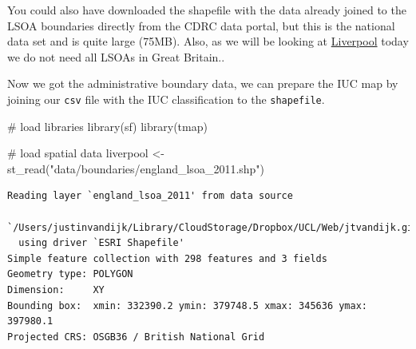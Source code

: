\documentclass[
  letterpaper,
  DIV=11,
  numbers=noendperiod]{scrreprt}
\newenvironment{Shaded}{\begin{snugshade}}{\end{snugshade}}
\newcommand{\CommentTok}[1]{\textcolor[rgb]{0.37,0.37,0.37}{#1}}
\newcommand{\FunctionTok}[1]{\textcolor[rgb]{0.28,0.35,0.67}{#1}}
\newcommand{\NormalTok}[1]{\textcolor[rgb]{0.00,0.23,0.31}{#1}}
\newcommand{\OtherTok}[1]{\textcolor[rgb]{0.00,0.23,0.31}{#1}}
\newcommand{\StringTok}[1]{\textcolor[rgb]{0.13,0.47,0.30}{#1}}
\begin{document}
\begin{tcolorbox}[enhanced jigsaw, rightrule=.15mm, colback=white, opacityback=0, opacitybacktitle=0.6, coltitle=black, colbacktitle=quarto-callout-note-color!10!white, breakable, arc=.35mm, title=\textcolor{quarto-callout-note-color}{\faInfo}\hspace{0.5em}{Note}, left=2mm, leftrule=.75mm, bottomtitle=1mm, toprule=.15mm, bottomrule=.15mm, colframe=quarto-callout-note-color-frame, toptitle=1mm, titlerule=0mm]

You could also have downloaded the shapefile with the data already
joined to the LSOA boundaries directly from the CDRC data portal, but
this is the national data set and is quite large (75MB). Also, as we
will be looking at
\href{https://en.wikipedia.org/wiki/Liverpool}{Liverpool} today we do
not need all LSOAs in Great Britain..

\end{tcolorbox}

Now we got the administrative boundary data, we can prepare the IUC map
by joining our \texttt{csv} file with the IUC classification to the
\texttt{shapefile}.

\begin{codelisting}

\caption{\texttt{R code}}

\begin{Shaded}
\begin{Highlighting}[]
\CommentTok{\# load libraries}
\FunctionTok{library}\NormalTok{(sf)}
\FunctionTok{library}\NormalTok{(tmap)}

\CommentTok{\# load spatial data}
\NormalTok{liverpool }\OtherTok{\textless{}{-}} \FunctionTok{st\_read}\NormalTok{(}\StringTok{"data/boundaries/england\_lsoa\_2011.shp"}\NormalTok{)}
\end{Highlighting}
\end{Shaded}

\end{codelisting}

\begin{verbatim}
Reading layer `england_lsoa_2011' from data source 
  `/Users/justinvandijk/Library/CloudStorage/Dropbox/UCL/Web/jtvandijk.github.io/GEOG0114Q/data/boundaries/england_lsoa_2011.shp' 
  using driver `ESRI Shapefile'
Simple feature collection with 298 features and 3 fields
Geometry type: POLYGON
Dimension:     XY
Bounding box:  xmin: 332390.2 ymin: 379748.5 xmax: 345636 ymax: 397980.1
Projected CRS: OSGB36 / British National Grid
\end{verbatim}
\end{document}
